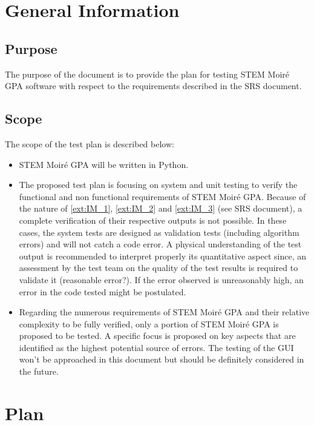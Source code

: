 \documentclass[12pt, titlepage]{article}
\newcommand{\progname}{STEM Moir{\'e} GPA}
\begin{document}
\newpage



\section{General Information}

\subsection{Purpose}

The purpose of the document is to provide the plan for testing \progname{} software with respect to the requirements described in the SRS document. 

\subsection{Scope}

The scope of the test plan is described below:
\begin{itemize}
\item \progname{} will be written in Python.
\item The proposed test plan is focusing on system and unit testing to verify the functional and non functional requirements of \progname{}. Because of the nature of \cref{ext:IM_1}, \cref{ext:IM_2} and \cref{ext:IM_3} (see SRS document), a complete verification of their respective outputs is not possible. In these cases, the system tests are designed as validation tests (including algorithm errors) and will not catch a code error. A physical understanding of the test output is recommended to interpret properly its quantitative aspect since, an assessment by the test team on the quality of the test results is required to validate it (reasonable error?). If the error observed is unreasonably high, an error in the code tested might be postulated.
\item Regarding the numerous requirements of \progname{} and their relative complexity to be fully verified, only a portion of \progname{} is proposed to be tested. A specific focus is proposed on key aspects that are identified as the highest potential source of errors. The testing of the GUI won't be approached in this document but should be definitely considered in the future.
\end{itemize}

\section{Plan}
\end{document}
